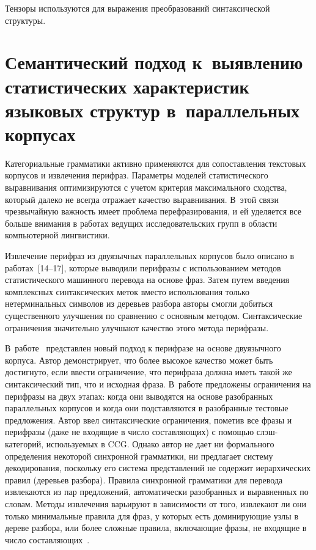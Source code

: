 \begin{multicols}{2}
  Тензоры используются для выражения преобразований синтаксической 
структуры.
     
\section{Семантический подход к~выявлению статистических 
характеристик языковых структур в~параллельных корпусах}
  
  Категориальные грамматики активно применяются для сопоставления 
текстовых корпусов и извлечения перифраз. Параметры моделей 
статистического выравнивания оптимизируются с учетом критерия 
максимального сходства, который далеко не всегда отражает качество 
выравнивания. В~этой связи чрезвычайную важность имеет проблема 
перефразирования, и ей уделяется все больше внимания в работах ведущих 
исследовательских групп в области компьютерной лингвистики. 

Извлечение 
перифраз из двуязычных параллельных корпусов было описано в 
  работах~[14--17], %
  которые выводили 
перифразы с использованием методов статистического машинного перевода 
на основе фраз. Затем путем введения комплексных синтаксических меток 
вместо использования только нетерминальных символов из деревьев разбора 
авторы смогли добиться существенного улучшения по сравнению с 
основным методом. Синтаксические ограничения значительно улучшают 
качество этого метода перифразы. 

В~работе~\cite{16-koz} представлен новый 
подход к перифразе на основе двуязычного корпуса. Автор демонстрирует, 
что более высокое качество может быть достигнуто, если ввести 
ограничение, что перифраза должна иметь такой же синтаксический тип, что 
и исходная фраза. В~работе предложены ограничения на перифразы на двух 
этапах: когда они выводятся на основе разобранных параллельных корпусов 
и когда они подставляются в разобранные тестовые предложения. Автор ввел 
синтаксические ограничения, пометив все фразы и перифразы (даже не 
входящие в число со\-став\-ля\-ющих) с помощью слэш-ка\-те\-го\-рий, 
исполь\-зу\-емых в  CCG. Однако автор не дает ни формального 
определения некоторой синхронной грамматики, ни предлагает систему 
декодирования, поскольку его система представлений не содержит 
иерархических правил (деревьев разбора). Правила синхронной грамматики 
для перевода извлекаются из пар предложений, автоматически разобранных 
и выравненных по словам. Методы извлечения варьи\-ру\-ют в зависимости от 
того, извлекают ли они только минимальные правила для фраз, у которых 
есть доминирующие узлы в дереве разбора, или более сложные правила, 
включающие фразы, не входящие в число составляющих~\cite{17-koz}. 


\end{multicols}

